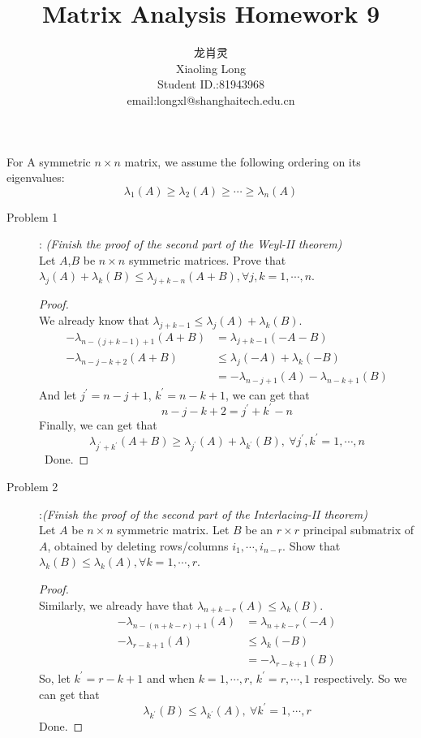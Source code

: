 \documentclass[a4paper]{article}
\title{Matrix Analysis Homework 9}
\author{龙肖灵 \\Xiaoling Long\\Student ID.:81943968\\email:longxl@shanghaitech.edu.cn}
\begin{document}
\maketitle

For A symmetric $n\times n$ matrix, we assume the following ordering on its eigenvalues: $$\lambda_{1}(A)\ge \lambda_{2}(A)\ge \cdots \ge \lambda_{n}(A)$$
\begin{description}
  \item[Problem 1]: \textit{(Finish the proof of the second part of the Weyl-II theorem)}\\
  Let $A$,$B$ be $n\times n$ symmetric matrices. Prove that $\lambda_{j}(A)+\lambda_{k}(B)\le\lambda_{j+k−n}(A+B),\forall j,k=1,\cdots,n$.

  \begin{proof}\ \\
    We already know that $\lambda_{j+k-1}\le \lambda_{j}(A)+\lambda_{k}(B)$.
    \begin{align*}
      -\lambda_{n-(j+k-1)+1}(A+B)&= \lambda_{j+k-1}(-A-B)\\
      -\lambda_{n-j-k+2}(A+B)&\le \lambda_{j}(-A)+\lambda_{k}(-B)\\
      &=-\lambda_{n-j+1}(A)-\lambda_{n-k+1}(B)
    \end{align*}
    And let $j^{\prime}=n-j+1$, $k^{\prime}=n-k+1$, we can get that $$n-j-k+2=j^{\prime}+k^{\prime}-n$$
    Finally, we can get that $$\lambda_{j^{\prime}+k^{\prime}}(A+B)\ge \lambda_{j^{\prime}}(A)+\lambda_{k^{\prime}}(B),\ \forall j^{\prime},k^{\prime}=1,\cdots,n$$\
    Done.
  \end{proof}

  \item[Problem 2]:\textit{(Finish the proof of the second part of the Interlacing-II theorem)}\\
   Let $A$ be $n\times n$ symmetric matrix. Let $B$ be an $r\times r$ principal submatrix of $A$, obtained by deleting rows/columns $i_{1},\cdots,i_{n−r}$. Show that $\lambda_{k}(B)\le\lambda_{k}(A),\forall k=1,\cdots,r$.

  \begin{proof}\ \\
    Similarly, we already have that $\lambda_{n+k-r}(A)\le \lambda_{k}(B)$.
    \begin{align*}
      -\lambda_{n-(n+k-r)+1}(A)&=\lambda_{n+k-r}(-A)\\
      -\lambda_{r-k+1}(A)&\le \lambda_{k}(-B)\\
      &=-\lambda_{r-k+1}(B)
    \end{align*}
    So, let $k^{\prime}=r-k+1$ and when $k=1,\cdots,r$, $k^{\prime}=r,\cdots,1$ respectively. So we can get that $$\lambda_{k^{\prime}}(B)\le\lambda_{k^{\prime}}(A),\ \forall k^{\prime}=1,\cdots,r$$
    Done.
  \end{proof}


\end{description}
\end{document}
